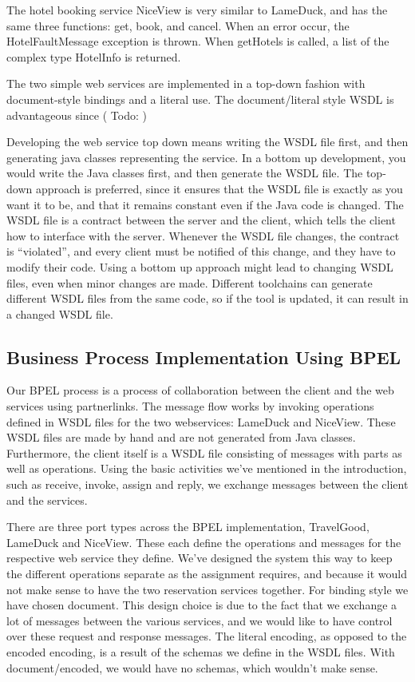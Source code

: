 \documentclass[english, a4paper, 12pt]{article}
\begin{document}
The hotel booking service NiceView is very similar to LameDuck, and has the same three functions: get, book, and cancel. When an error occur, the HotelFaultMessage exception is thrown. When getHotels is called, a list of the complex type HotelInfo is returned.

The two simple web services are implemented in a top-down fashion with document-style bindings and a literal use. The document/literal style WSDL is advantageous since ( Todo: )

Developing the web service top down means writing the WSDL file first, and then generating java classes representing the service. In a bottom up development, you would write the Java classes first, and then generate the WSDL file. The top-down approach is preferred, since it ensures that the WSDL file is exactly as you want it to be, and that it remains constant even if the Java code is changed. The WSDL file is a contract between the server and the client, which tells the client how to interface with the server. Whenever the WSDL file changes, the contract is “violated”, and  every client must be notified of this change, and they have to modify their code. Using a bottom up approach might lead to changing WSDL files, even when minor changes are made. Different toolchains can generate different WSDL files from the same code, so if the tool is updated, it can result in a changed WSDL file.

\subsection{Business Process Implementation Using BPEL}
Our BPEL process is a process of collaboration between the client and the web services using partnerlinks. The message flow works by invoking operations defined in WSDL files for the two webservices: LameDuck and NiceView. These WSDL files are made by hand and are not generated from Java classes. Furthermore, the client itself is a WSDL file consisting of messages with parts as well as operations. Using the basic activities we’ve mentioned in the introduction, such as receive, invoke, assign and reply, we exchange messages between the client and the services.

There are three port types across the BPEL implementation, TravelGood, LameDuck and NiceView. These each define the operations and messages for the respective web service they define. We’ve designed the system this way to keep the different operations separate as the assignment requires, and because it would not make sense to have the two reservation services together. 
For binding style we have chosen document. This design choice is due to the fact that we exchange a lot of messages between the various services, and we would like to have control over these request and response messages. The literal encoding, as opposed to the encoded encoding, is a result of the schemas we define in the WSDL files. With document/encoded, we would have no schemas, which wouldn’t make sense.
\end{document}
